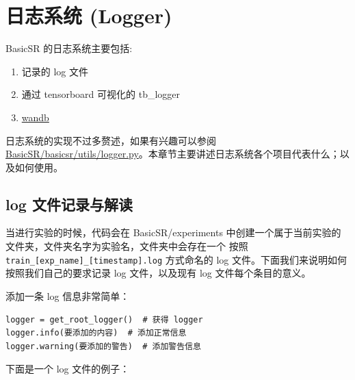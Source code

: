 \documentclass[../main.tex]{subfiles}
\begin{document}
\section{日志系统 (Logger)}\label{code_structure:logger}

BasicSR 的日志系统主要包括:

\begin{enumerate}
    \item 记录的 log 文件
    \item 通过 tensorboard 可视化的 tb\_logger
    \item \href{https://wandb.ai/}{wandb}
\end{enumerate}

日志系统的实现不过多赘述，如果有兴趣可以参阅 \href{https://github.com/XPixelGroup/BasicSR/blob/master/basicsr/utils/logger.py}{BasicSR/basicsr/utils/logger.py}。本章节主要讲述日志系统各个项目代表什么；以及如何使用。

\subsection{log 文件记录与解读}\label{code_structure:log_record}

当进行实验的时候，代码会在 BasicSR/experiments 中创建一个属于当前实验的文件夹，文件夹名字为实验名，文件夹中会存在一个 按照 \texttt{train\_[exp\_name]\_[timestamp].log} 方式命名的 log 文件。下面我们来说明如何按照我们自己的要求记录 log 文件，以及现有 log 文件每个条目的意义。

\begin{hl} %

    添加一条 log 信息非常简单：

\begin{verbatim}
logger = get_root_logger()  # 获得 logger
logger.info(要添加的内容)  # 添加正常信息
logger.warning(要添加的警告)  # 添加警告信息
\end{verbatim}
\end{hl}

下面是一个 log 文件的例子：
\end{document}

